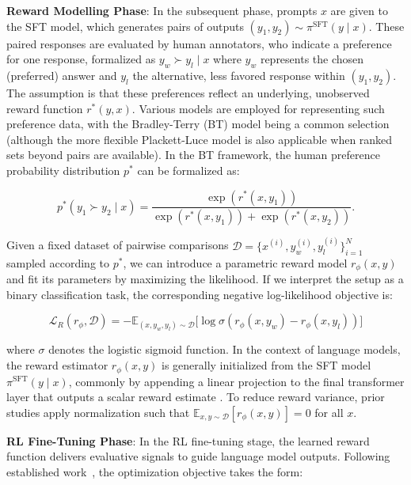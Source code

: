 \textbf{Reward Modelling Phase}: In the subsequent phase, prompts $x$ are given to the SFT model, which generates pairs of outputs $(y_1, y_2)\sim \pi^\text{SFT}(y \mid x)$. These paired responses are evaluated by human annotators, who indicate a preference for one response, formalized as $y_w\succ y_l \mid x$ where $y_w$ represents the chosen (preferred) answer and $y_l$ the alternative, less favored response within $(y_1, y_2)$. The assumption is that these preferences reflect an underlying, unobserved reward function $r^*(y, x)$. Various models are employed for representing such preference data, with the Bradley-Terry (BT) model \cite{bradley1952rankanalysis} being a common selection (although the more flexible Plackett-Luce model \citep{plackett1975analysis, luce2012individual} is also applicable when ranked sets beyond pairs are available). In the BT framework, the human preference probability distribution $p^*$ can be formalized as:

\begin{equation}\label{eq:bradley-terry}
    p^*(y_1\succ y_2 \mid x)=\frac{\exp\left(r^*(x, y_1)\right)}{\exp\left(r^*(x, y_1)\right) + \exp\left(r^*(x, y_2)\right)}.
\end{equation}

Given a fixed dataset of pairwise comparisons $\mathcal{D}=\bigl\{x^{(i)}, y_w^{(i)}, y_l^{(i)}\bigr\}_{i=1}^N$ sampled according to $p^*$, we can introduce a parametric reward model $r_{\phi}(x, y)$ and fit its parameters by maximizing the likelihood. If we interpret the setup as a binary classification task, the corresponding negative log-likelihood objective is:

\begin{equation}\label{eq:reward_model}
    \mathcal{L}_R(r_{\phi}, \mathcal{D}) = -\mathbb{E}_{(x, y_w, y_l)\sim \mathcal{D}}\bigl[\log \sigma(r_{\phi}(x, y_w)- r_{\phi}(x, y_l))\bigr]
\end{equation}

where $\sigma$ denotes the logistic sigmoid function. In the context of language models, the reward estimator $r_{\phi}(x, y)$ is generally initialized from the SFT model $\pi^\text{SFT}(y \mid x)$, commonly by appending a linear projection to the final transformer layer that outputs a scalar reward estimate \cite{ziegler2020finetuning}. To reduce reward variance, prior studies apply normalization such that $\mathbb{E}_{x,y\sim \mathcal{D}}\left[r_\phi(x, y)\right] = 0$ for all $x$.

\textbf{RL Fine-Tuning Phase}: In the RL fine-tuning stage, the learned reward function delivers evaluative signals to guide language model outputs. Following established work~\citep{jaques2017sequence, jaques2020human}, the optimization objective takes the form:

